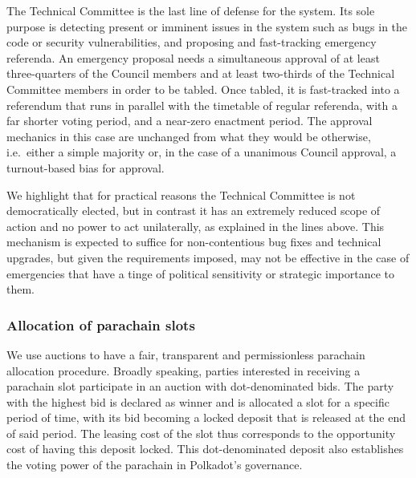 The Technical Committee is the last line of defense for the system. Its sole purpose is detecting present or imminent issues in the system such as bugs in the code or security vulnerabilities, and proposing and fast-tracking emergency referenda. An emergency proposal needs a simultaneous approval of at least three-quarters of the Council members and at least two-thirds of the Technical Committee members in order to be tabled. Once tabled, it is fast-tracked into a referendum that runs in parallel with the timetable of regular referenda, with a far shorter voting period, and a near-zero enactment period. The approval mechanics in this case are unchanged from what they would be otherwise, i.e.~either a simple majority or, in the case of a unanimous Council approval, a turnout-based bias for approval.

We highlight that for practical reasons the Technical Committee is not democratically elected, but in contrast it has an extremely reduced scope of action and no power to act unilaterally, as explained in the lines above. This mechanism is expected to suffice for non-contentious bug fixes and technical upgrades, but given the requirements imposed, may not be effective in the case of emergencies that have a tinge of political sensitivity or strategic importance to them. 
 

\subsubsection{Allocation of parachain slots}\label{s:pAllocation}

We use auctions to have a fair, transparent and permissionless parachain allocation procedure. 
Broadly speaking, parties interested in receiving a parachain slot participate in an auction with dot-denominated bids. The party with the highest bid is declared as winner and is allocated a slot for a specific period of time, with its bid becoming a locked deposit that is released at the end of said period. The leasing cost of the slot thus corresponds to the opportunity cost of having this deposit locked. This dot-denominated deposit also establishes the voting power of the parachain in Polkadot's governance.


